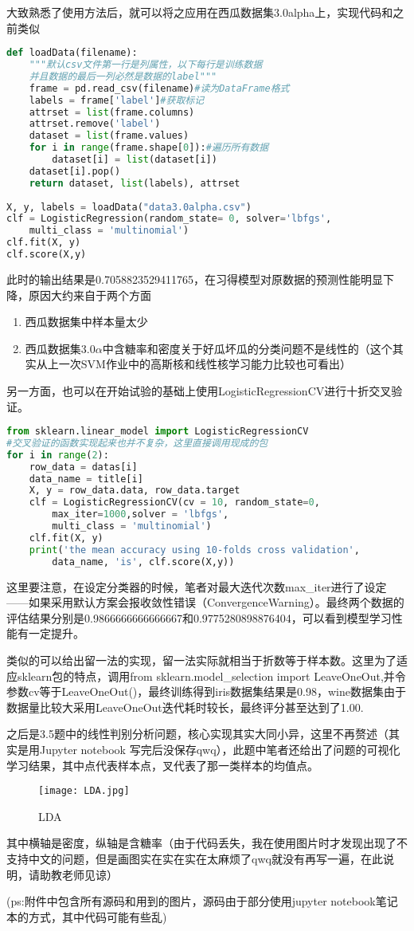 \documentclass[UTF8]{ctexart}
\begin{document}
大致熟悉了使用方法后，就可以将之应用在西瓜数据集3.0alpha上，实现代码和之前类似
\begin{lstlisting}[language=python]
def loadData(filename):
	"""默认csv文件第一行是列属性，以下每行是训练数据
	并且数据的最后一列必然是数据的label"""
	frame = pd.read_csv(filename)#读为DataFrame格式
	labels = frame['label']#获取标记
	attrset = list(frame.columns)
	attrset.remove('label')
	dataset = list(frame.values)
	for i in range(frame.shape[0]):#遍历所有数据
		dataset[i] = list(dataset[i])
	dataset[i].pop()
	return dataset, list(labels), attrset
	
X, y, labels = loadData("data3.0alpha.csv")
clf = LogisticRegression(random_state= 0, solver='lbfgs', 
	multi_class = 'multinomial')
clf.fit(X, y)
clf.score(X,y)
\end{lstlisting}

此时的输出结果是0.7058823529411765，在习得模型对原数据的预测性能明显下降，原因大约来自于两个方面
\begin{enumerate}
	\item 西瓜数据集中样本量太少
	\item 西瓜数据集3.0$ \alpha $中含糖率和密度关于好瓜坏瓜的分类问题不是线性的（这个其实从上一次SVM作业中的高斯核和线性核学习能力比较也可看出）
\end{enumerate}

另一方面，也可以在开始试验的基础上使用LogisticRegressionCV进行十折交叉验证。
\begin{lstlisting}[language = python]
from sklearn.linear_model import LogisticRegressionCV
#交叉验证的函数实现起来也并不复杂，这里直接调用现成的包
for i in range(2):
	row_data = datas[i]
	data_name = title[i]
	X, y = row_data.data, row_data.target
	clf = LogisticRegressionCV(cv = 10, random_state=0,
		max_iter=1000,solver = 'lbfgs',
		multi_class = 'multinomial')
	clf.fit(X, y)
	print('the mean accuracy using 10-folds cross validation',      
		data_name, 'is', clf.score(X,y))  
\end{lstlisting}

这里要注意，在设定分类器的时候，笔者对最大迭代次数max\_iter进行了设定——如果采用默认方案会报收敛性错误（ConvergenceWarning）。最终两个数据的评估结果分别是0.9866666666666667和0.9775280898876404，可以看到模型学习性能有一定提升。

类似的可以给出留一法的实现，留一法实际就相当于折数等于样本数。这里为了适应sklearn包的特点，调用from sklearn.model\_selection import LeaveOneOut,并令参数cv等于LeaveOneOut()，最终训练得到iris数据集结果是0.98，wine数据集由于数据量比较大采用LeaveOneOut迭代耗时较长，最终评分甚至达到了1.00.

之后是3.5题中的线性判别分析问题，核心实现其实大同小异，这里不再赘述（其实是用Jupyter notebook 写完后没保存qwq），此题中笔者还给出了问题的可视化学习结果，其中点代表样本点，叉代表了那一类样本的均值点。
\begin{figure}[htbp]
	\centering
	\texttt{[image: LDA.jpg]}
	\caption{LDA}
\end{figure}

其中横轴是密度，纵轴是含糖率（由于代码丢失，我在使用图片时才发现出现了不支持中文的问题，但是画图实在实在实在太麻烦了qwq就没有再写一遍，在此说明，请助教老师见谅）

(ps:附件中包含所有源码和用到的图片，源码由于部分使用jupyter notebook笔记本的方式，其中代码可能有些乱)
\end{document}
